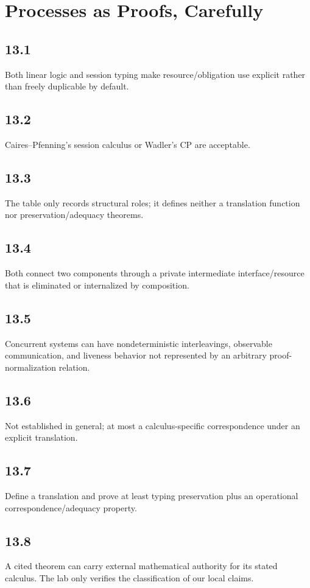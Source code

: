 \chapter{Processes as Proofs, Carefully}

\section*{13.1}
Both linear logic and session typing make resource/obligation use explicit rather than freely duplicable by default.

\section*{13.2}
Caires--Pfenning's session calculus or Wadler's CP are acceptable.

\section*{13.3}
The table only records structural roles; it defines neither a translation function nor preservation/adequacy theorems.

\section*{13.4}
Both connect two components through a private intermediate interface/resource that is eliminated or internalized by composition.

\section*{13.5}
Concurrent systems can have nondeterministic interleavings, observable communication, and liveness behavior not represented by an arbitrary proof-normalization relation.

\section*{13.6}
Not established in general; at most a calculus-specific correspondence under an explicit translation.

\section*{13.7}
Define a translation and prove at least typing preservation plus an operational correspondence/adequacy property.

\section*{13.8}
A cited theorem can carry external mathematical authority for its stated calculus. The lab only verifies the classification of our local claims.

